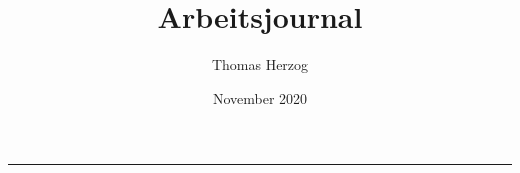 \documentclass[a4paper, 12pt]{article}
\title{{\huge Arbeitsjournal}}
\author{Thomas Herzog}
\date{November 2020}
\begin{document}
	\maketitle
	\hrule
	\pagebreak
	
	\renewcommand{\contentsname}{Inhaltsverzeichnis}
	\tableofcontents
	\pagebreak
	
	
	\pagebreak
	
	
	\pagebreak
	
	
	\pagebreak
	
	
	\pagebreak
	
	\renewcommand{\refname}{Literaturverzeichnis}
	
	
	
\end{document}
